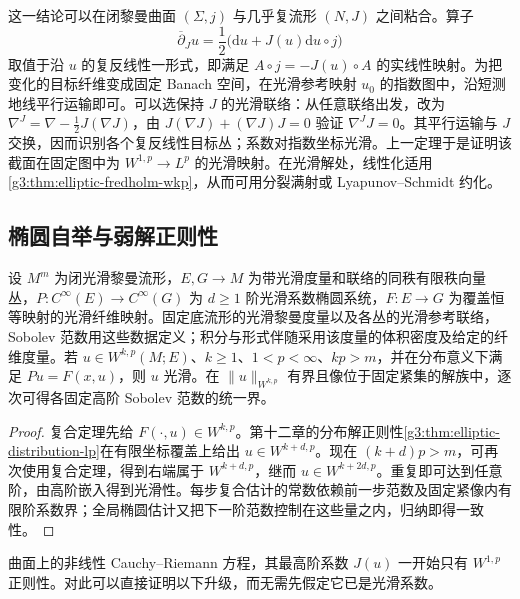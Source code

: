 这一结论可以在闭黎曼曲面 \((\Sigma,j)\) 与几乎复流形 \((N,J)\) 之间粘合。算子
\[
	\overline\partial_Ju=\frac12\bigl(\mathrm du+J(u)\mathrm du\circ j\bigr)
\]
取值于沿 \(u\) 的复反线性一形式，即满足 \(A\circ j=-J(u)\circ A\) 的实线性映射。为把变化的目标纤维变成固定 Banach 空间，在光滑参考映射 \(u_0\) 的指数图中，沿短测地线平行运输即可。可以选保持 \(J\) 的光滑联络：从任意联络出发，改为 \(\nabla^J=\nabla-\tfrac12J(\nabla J)\)，由 \(J(\nabla J)+(\nabla J)J=0\) 验证 \(\nabla^JJ=0\)。其平行运输与 \(J\) 交换，因而识别各个复反线性目标丛；系数对指数坐标光滑。上一定理于是证明该截面在固定图中为 \(W^{1,p}\to L^p\) 的光滑映射。在光滑解处，线性化适用\cref{g3:thm:elliptic-fredholm-wkp}，从而可用分裂满射或 Lyapunov--Schmidt 约化。

\subsection{椭圆自举与弱解正则性}
\label{g3:subsec:1306:05}
\begin{theorem}\label{g3:thm:semilinear-sobolev-bootstrap}
	设 \(M^m\) 为闭光滑黎曼流形，\(E,G\to M\) 为带光滑度量和联络的同秩有限秩向量丛，\(P:C^\infty(E)\to C^\infty(G)\) 为 \(d\ge1\) 阶光滑系数椭圆系统，\(F:E\to G\) 为覆盖恒等映射的光滑纤维映射。固定底流形的光滑黎曼度量以及各丛的光滑参考联络，Sobolev 范数用这些数据定义；积分与形式伴随采用该度量的体积密度及给定的纤维度量。若 \(u\in W^{k,p}(M;E)\)、\(k\ge1\)、\(1<p<\infty\)、\(kp>m\)，并在分布意义下满足 \(Pu=F(x,u)\)，则 \(u\) 光滑。在 \(\|u\|_{W^{k,p}}\) 有界且像位于固定紧集的解族中，逐次可得各固定高阶 Sobolev 范数的统一界。
\end{theorem}
\begin{proof}
	复合定理先给 \(F(\cdot,u)\in W^{k,p}\)。第十二章的分布解正则性\cref{g3:thm:elliptic-distribution-lp}在有限坐标覆盖上给出 \(u\in W^{k+d,p}\)。现在 \((k+d)p>m\)，可再次使用复合定理，得到右端属于 \(W^{k+d,p}\)，继而 \(u\in W^{k+2d,p}\)。重复即可达到任意阶，由高阶嵌入得到光滑性。每步复合估计的常数依赖前一步范数及固定紧像内有限阶系数界；全局椭圆估计又把下一阶范数控制在这些量之内，归纳即得一致性。
\end{proof}

曲面上的非线性 Cauchy--Riemann 方程，其最高阶系数 \(J(u)\) 一开始只有 \(W^{1,p}\) 正则性。对此可以直接证明以下升级，而无需先假定它已是光滑系数。

